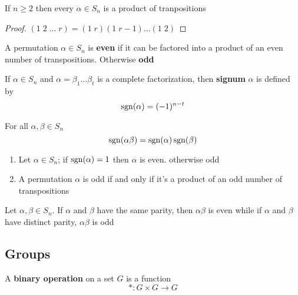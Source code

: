 \documentclass[11pt]{article}
\begin{document}
\begin{proposition}[]
If \(n\ge 2\) then every \(\alpha\in S_n\) is a product of tranpositions
\end{proposition}
\begin{proof}
\((1\;2\;\dots\; r)=(1\; r)(1\; r-1)\dots(1\; 2)\)
\end{proof}


\begin{definition}[]
A permutation \(\alpha\in S_n\) is \textbf{even} if it can be factored into a
product of an even number of transpositions. Otherwise \textbf{odd}
\end{definition}

\begin{definition}[]
If \(\alpha\in S_n\) and \(\alpha=\beta_1\dots\beta_t\) is a complete
factorization, then \textbf{signum} \(\alpha\) is defined by
\begin{equation*}
\operatorname{sgn}(\alpha)=(-1)^{n-t}
\end{equation*}
\end{definition}

\begin{theorem}[]
For all \(\alpha,\beta\in S_n\)
\begin{equation*}
\operatorname{sgn}(\alpha\beta)=\operatorname{sgn}(\alpha)\operatorname{sgn}(\beta)
\end{equation*}
\end{theorem}

\begin{theorem}[]
\begin{enumerate}
\item Let \(\alpha\in S_n\); if \(\operatorname{sgn}(\alpha)=1\) then \(\alpha\) is even. otherwise
odd
\item A permutation \(\alpha\) is odd if and only if it's a product of an odd
number of transpositions
\end{enumerate}
\end{theorem}

\begin{corollary}[]
Let \(\alpha,\beta\in S_n\). If \(\alpha\) and \(\beta\) have the same parity, then
\(\alpha\beta\) is even while if \(\alpha\) and \(\beta\) have distinct parity,
\(\alpha\beta\) is odd
\end{corollary}
\subsection{Groups}
\label{sec:org0a25b16}
\begin{definition}[]
A \textbf{binary operation} on a set \(G\) is a function
\begin{equation*}
*:G\times G\to G
\end{equation*}
\end{definition}
\end{document}
